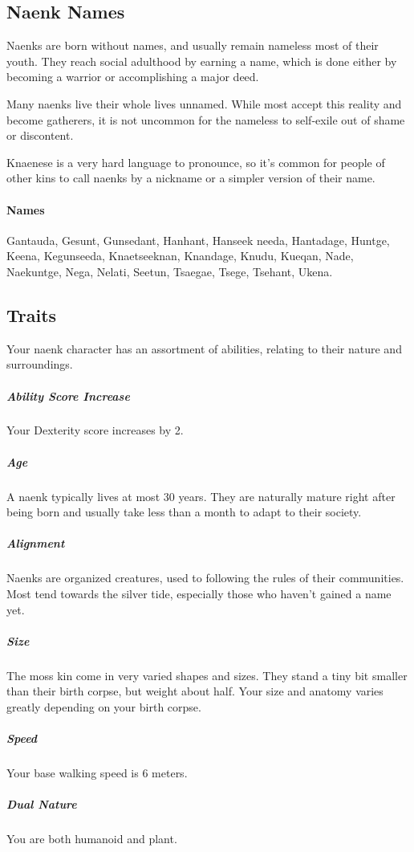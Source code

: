\subsection*{Naenk Names}
    Naenks are born without names, and usually remain nameless most of their youth.
    They reach social adulthood by earning a name, which is done either by becoming a warrior or accomplishing a major deed.

    Many naenks live their whole lives unnamed.
    While most accept this reality and become gatherers, it is not uncommon for the nameless to self-exile out of shame or discontent.

    Knaenese is a very hard language to pronounce, so it's common for people of other kins to call naenks by a nickname or a simpler version of their name.

    \paragraph{Names}
    Gantauda, Gesunt, Gunsedant, Hanhant, Hanseek needa, Hantadage, Huntge, Keena, Kegunseeda, Knaetseeknan, Knandage, Knudu, Kueqan, Nade, Naekuntge, Nega, Nelati, Seetun, Tsaegae, Tsege, Tsehant, Ukena.

\subsection*{Traits}
    Your naenk character has an assortment of abilities, relating to their nature and surroundings.

    \subparagraph{Ability Score Increase} Your Dexterity score increases by 2.

    \subparagraph{Age} A naenk typically lives at most 30 years.
    They are naturally mature right after being born and usually take less than a month to adapt to their society.

    \subparagraph{Alignment} Naenks are organized creatures, used to following the rules of their communities.
    Most tend towards the silver tide, especially those who haven't gained a name yet.

    \subparagraph{Size} The moss kin come in very varied shapes and sizes.
    They stand a tiny bit smaller than their birth corpse, but weight about half.
    Your size and anatomy varies greatly depending on your birth corpse. \label{kin::naenk.size}

    \subparagraph{Speed} Your base walking speed is 6 meters.

    \subparagraph{Dual Nature} You are both humanoid and plant.

